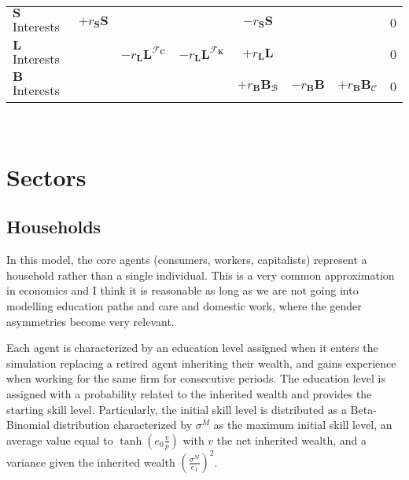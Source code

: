 \documentclass[a4paper, headings=standardclasses]{scrartcl}
\begin{document}
{\begin{tabularx}{\textwidth}{@{} Y|cccccc|l @{}}
		\midrule
		$\mathbf{S}$ Interests & $+r_{\mathbf{S}} \mathbf{S}$             &                                                         &                                                                        & $-r_{\mathbf{S}} \mathbf{S}$           &                                          &                                        & 0    \\
		$\mathbf{L}$ Interests &                                          & $-r_{\mathbf{L}} \mathbf{L}^{\mathcal{F}_{\mathbf{C}}}$ & $-r_{\mathbf{L}} \mathbf{L}^{\mathcal{F}_{\mathbf{K}}}$                & $+r_{\mathbf{L}} \mathbf{L}$           &                                          &                                        & 0    \\
		$\mathbf{B}$ Interests &                                          &                                                         &                                                                        & $+r_\mathbf{B} \mathbf{B}_\mathcal{B}$ & $-r_\mathbf{B} \mathbf{B}$               & $+r_\mathbf{B} \mathbf{B}_\mathcal{C}$ & 0    \\
		\bottomrule
	\end{tabularx}
}\\

\section{Sectors}
\subsection{Households}
In this model, the core agents (consumers, workers, capitalists) represent a household rather than a single individual. This is a very common approximation in economics and I think it is reasonable as long as we are not going into modelling education paths and care and domestic work, where the gender asymmetries become very relevant.

Each agent is characterized by an education level assigned when it enters the simulation replacing a retired agent inheriting their wealth, and gains experience when working for the same firm for consecutive periods.
The education level is assigned with a probability related to the inherited wealth and provides the starting skill level.
Particularly, the initial skill level is distributed as a Beta-Binomial distribution characterized by $\sigma^M$ as the maximum initial skill level, an average value equal to $\tanh(e_0 \frac{v}{p})$ with $v$ the net inherited wealth, and a variance given the inherited wealth $(\frac{\sigma^M}{e_1})^2$.
\end{document}
